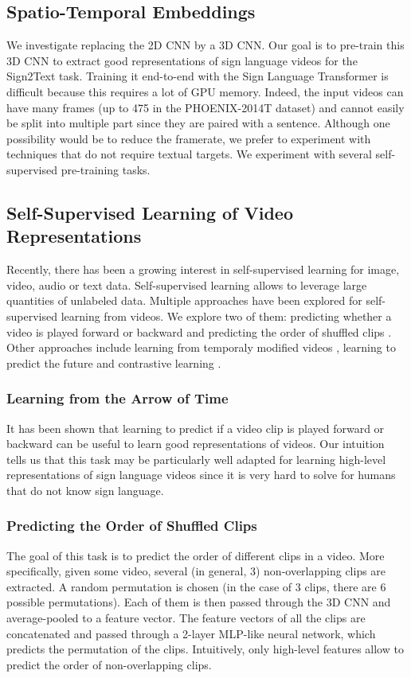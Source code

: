 \documentclass[final]{cvpr}
\begin{document}
\subsection{Spatio-Temporal Embeddings}
We investigate replacing the 2D CNN by a 3D CNN. Our goal is to pre-train this 3D CNN to extract good representations of sign language videos for the Sign2Text task. Training it end-to-end with the Sign Language Transformer is difficult because this requires a lot of GPU memory. Indeed, the input videos can have many frames (up to 475 in the PHOENIX-2014T \cite{phoenix} dataset) and cannot easily be split into multiple part since they are paired with a sentence. Although one possibility would be to reduce the framerate, we prefer to experiment with techniques that do not require textual targets. We experiment with several self-supervised pre-training tasks.
\subsection{Self-Supervised Learning of Video Representations}
Recently, there has been a growing interest in self-supervised learning for image, video, audio or text data. Self-supervised learning allows to leverage large quantities of unlabeled data. Multiple approaches have been explored for self-supervised learning from videos. We explore two of them: predicting whether a video is played forward or backward \cite{arrow} and predicting the order of shuffled clips \cite{vcop}. Other approaches include learning from temporaly modified videos \cite{playback-rate, pace, temp-trans}, learning to predict the future \cite{pred-coding} and contrastive learning \cite{bert-video}.
\subsubsection{Learning from the Arrow of Time}
It has been shown \cite{arrow} that learning to predict if a video clip is played forward or backward can be useful to learn good representations of videos. Our intuition tells us that this task may be particularly well adapted for learning high-level representations of sign language videos since it is very hard to solve for humans that do not know sign language.

\subsubsection{Predicting the Order of Shuffled Clips}
The goal of this task is to predict the order of different clips in a video. More specifically, given some video, several (in general, 3) non-overlapping clips are extracted. A random permutation is chosen (in the case of 3 clips, there are 6 possible permutations). Each of them is then passed through the 3D CNN and average-pooled to a feature vector. The feature vectors of all the clips are concatenated and passed through a 2-layer MLP-like neural network, which predicts the permutation of the clips. Intuitively, only high-level features allow to predict the order of non-overlapping clips.
\end{document}
